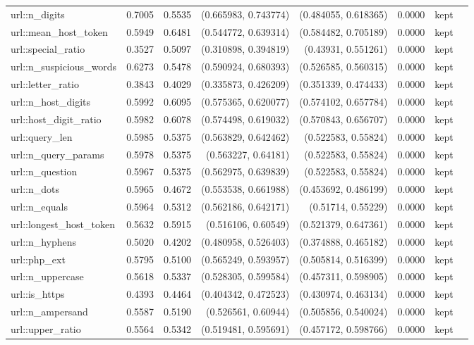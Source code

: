 \begin{table}[t]
\begin{tabular}{llrrrrrr}
url::n\_digits & 0.7005 & 0.5535 & (0.665983, 0.743774) & (0.484055, 0.618365) & 0.0000 & kept &  \\
url::mean\_host\_token & 0.5949 & 0.6481 & (0.544772, 0.639314) & (0.584482, 0.705189) & 0.0000 & kept &  \\
url::special\_ratio & 0.3527 & 0.5097 & (0.310898, 0.394819) & (0.43931, 0.551261) & 0.0000 & kept &  \\
url::n\_suspicious\_words & 0.6273 & 0.5478 & (0.590924, 0.680393) & (0.526585, 0.560315) & 0.0000 & kept &  \\
url::letter\_ratio & 0.3843 & 0.4029 & (0.335873, 0.426209) & (0.351339, 0.474433) & 0.0000 & kept &  \\
url::n\_host\_digits & 0.5992 & 0.6095 & (0.575365, 0.620077) & (0.574102, 0.657784) & 0.0000 & kept &  \\
url::host\_digit\_ratio & 0.5982 & 0.6078 & (0.574498, 0.619032) & (0.570843, 0.656707) & 0.0000 & kept &  \\
url::query\_len & 0.5985 & 0.5375 & (0.563829, 0.642462) & (0.522583, 0.55824) & 0.0000 & kept &  \\
url::n\_query\_params & 0.5978 & 0.5375 & (0.563227, 0.64181) & (0.522583, 0.55824) & 0.0000 & kept &  \\
url::n\_question & 0.5967 & 0.5375 & (0.562975, 0.639839) & (0.522583, 0.55824) & 0.0000 & kept &  \\
url::n\_dots & 0.5965 & 0.4672 & (0.553538, 0.661988) & (0.453692, 0.486199) & 0.0000 & kept &  \\
url::n\_equals & 0.5964 & 0.5312 & (0.562186, 0.642171) & (0.51714, 0.55229) & 0.0000 & kept &  \\
url::longest\_host\_token & 0.5632 & 0.5915 & (0.516106, 0.60549) & (0.521379, 0.647361) & 0.0000 & kept &  \\
url::n\_hyphens & 0.5020 & 0.4202 & (0.480958, 0.526403) & (0.374888, 0.465182) & 0.0000 & kept &  \\
url::php\_ext & 0.5795 & 0.5100 & (0.565249, 0.593957) & (0.505814, 0.516399) & 0.0000 & kept &  \\
url::n\_uppercase & 0.5618 & 0.5337 & (0.528305, 0.599584) & (0.457311, 0.598905) & 0.0000 & kept &  \\
url::is\_https & 0.4393 & 0.4464 & (0.404342, 0.472523) & (0.430974, 0.463134) & 0.0000 & kept &  \\
url::n\_ampersand & 0.5587 & 0.5190 & (0.526561, 0.60944) & (0.505856, 0.540024) & 0.0000 & kept &  \\
url::upper\_ratio & 0.5564 & 0.5342 & (0.519481, 0.595691) & (0.457172, 0.598766) & 0.0000 & kept &  \\

\end{tabular}
\end{table}
